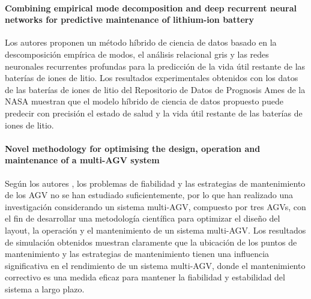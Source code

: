 \paragraph{Combining empirical mode decomposition and deep recurrent neural networks for predictive maintenance of lithium-ion battery}
Los autores proponen \cite{CHEN2021101405} un método híbrido de ciencia de datos basado en la descomposición empírica de modos, el análisis relacional gris 
y las redes neuronales recurrentes profundas para la predicción de la vida útil restante de las baterías de iones de litio.
Los resultados experimentales obtenidos con los datos de las baterías de iones de litio del Repositorio de 
Datos de Prognosis Ames de la NASA muestran que el modelo híbrido de ciencia de datos propuesto puede 
predecir con precisión el estado de salud y la vida útil restante de las baterías de iones de litio.

\paragraph{Novel methodology for optimising the design, operation and maintenance of a multi-AGV system}
Según los autores \cite{YAN2018130}, los problemas de fiabilidad y las estrategias de mantenimiento de los AGV no se han estudiado suficientemente,
por lo que han realizado una investigación considerando un sistema multi-AGV, compuesto por tres AGVs, con 
el fin de desarrollar una metodología científica para optimizar el diseño del layout, la operación y el 
mantenimiento de un sistema multi-AGV. Los resultados de simulación obtenidos muestran claramente que la 
ubicación de los puntos de mantenimiento y las estrategias de mantenimiento tienen una influencia 
significativa en el rendimiento de un sistema multi-AGV, donde el mantenimiento correctivo es una medida 
eficaz para mantener la fiabilidad y estabilidad del sistema a largo plazo.